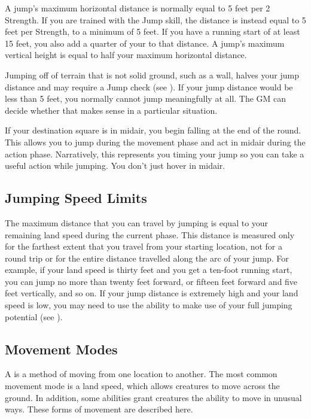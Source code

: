         A jump's maximum horizontal distance is normally equal to 5 feet per 2 Strength.
        If you are trained with the Jump skill, the distance is instead equal to 5 feet per Strength, to a minimum of 5 feet.
        If you have a running start of at least 15 feet, you also add a quarter of your  to that distance.
        A jump's maximum vertical height is equal to half your maximum horizontal distance.

        Jumping off of terrain that is not solid ground, such as a wall, halves your jump distance and may require a Jump check (see ).
        If your jump distance would be less than 5 feet, you normally cannot jump meaningfully at all.
        The GM can decide whether that makes sense in a particular situation.

        If your destination square is in midair, you begin falling at the end of the round.
        This allows you to jump during the movement phase and act in midair during the action phase.
        Narratively, this represents you timing your jump so you can take a useful action while jumping.
        You don't just hover in midair.

        \subsection{Jumping Speed Limits}
            The maximum distance that you can travel by jumping is equal to your remaining land speed during the current phase.
            This distance is measured only for the farthest extent that you travel from your starting location, not for a round trip or for the entire distance travelled along the arc of your jump.
            For example, if your land speed is thirty feet and you get a ten-foot running start, you can jump no more than twenty feet forward, or fifteen feet forward and five feet vertically, and so on.
            If your jump distance is extremely high and your land speed is low, you may need to use the  ability to make use of your full jumping potential (see ).

    \subsection{Movement Modes}\label{Movement Modes}
        A  is a method of moving from one location to another.
        The most common movement mode is a land speed, which allows creatures to move across the ground.
        In addition, some abilities grant creatures the ability to move in unusual ways.
        These forms of movement are described here.

